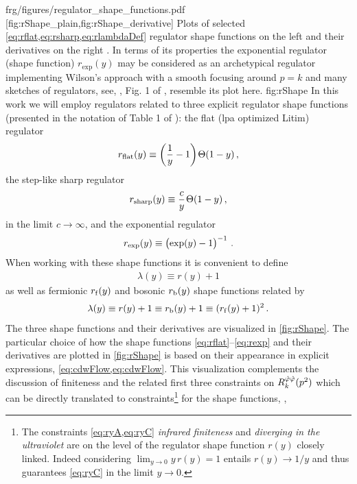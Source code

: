 \fullWidthFigure%
	{frg/figures/regulator_shape_functions.pdf}%
	[fig:rShape_plain,fig:rShape_derivative]%
	{%
		Plots of selected \dash{} \cf{} \cref{eq:rflat,eq:rsharp,eq:rlambdaDef} \dash{} regulator shape functions on the left  and their derivatives on the right .
		In terms of its properties the exponential regulator (shape function) $r_\mathrm{exp}(y)$ may be considered as an archetypical \frg{} regulator implementing Wilson's \rg{} approach with a smooth focusing around $p=k$ and many sketches of \frg{} regulators, see, \eg{}, Fig. 1 of , resemble its plot here.%
	}%
	{fig:rShape}%
In this work we will employ regulators related to three explicit regulator shape functions (presented in the notation of Table 1 of ): the flat (\acrshort{lpa} optimized Litim) regulator~
\begin{align}
	r_\mathrm{flat}(y)\equiv\del{\frac{1}{y}-1}\mkern-1.5mu\thetaLitim(1-y)\,,
\label{eq:rflat}
\end{align}
the step-like sharp regulator
\begin{align}
	r_\mathrm{sharp}(y)\equiv\frac{c}{y}\mkern1.5mu\Theta(1-y)\,,
\label{eq:rsharp}
\end{align}
in the limit $c\rightarrow\infty$, and the exponential regulator
\begin{align}
	r_\mathrm{exp}(y)\equiv\del{\exp(y)-1}^{-1}\,.
\label{eq:rexp}
\end{align}
When working with these shape functions it is convenient to define 
\begin{align}
	\lambda(y)\equiv r(y)+1
	\label{eq:rlambdaDef}
\end{align}
as well as fermionic $r_\mathrm{f}(y)$ and bosonic $r_\mathrm{b}(y)$ shape functions related by
\begin{align}
	\lambda(y)\equiv r(y)+1\equiv r_\mathrm{b}(y)+1\equiv(r_\mathrm{f}(y)+1)^2\, .
	\label{eq:rfrbDef}
\end{align}
The three shape functions and their derivatives are visualized in \cref{fig:rShape}.
The particular choice of how the shape functions \eqref{eq:rflat}--\eqref{eq:rexp} and their derivatives are plotted in \cref{fig:rShape} is based on their appearance in explicit expressions, \cf{} \cref{eq:cdwFlow,eq:cdwFlow}.
This visualization complements the discussion of finiteness and the related first three constraints on $R_k^{\hat{\varphi}\hat{\varphi}}(p^2)$ which can be directly translated to constraints\footnote{%
	The constraints \cref{eq:ryA,eq:ryC} \dash{} \textit{infrared finiteness} and \textit{diverging in the ultraviolet} \dash{} are on the level of the regulator shape function $r(y)$ closely linked.
	Indeed considering ${\lim_{y\rightarrow 0 } y\, r(y)=1}$ entails $r(y)\rightarrow1/y$ and thus guarantees \cref{eq:ryC} in the limit $y\rightarrow0$.
} for the shape functions, \cf{} ,
